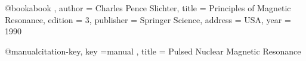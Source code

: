 @book{abook ,
author = {Charles Pence Slichter},
title = {Principles of Magnetic Resonance},
edition = {3},
publisher = {Springer Science},
address = {USA},
year = {1990}
}

@manual{citation-key,
    key ={manual} ,
    title = {Pulsed Nuclear Magnetic Resonance}
}
